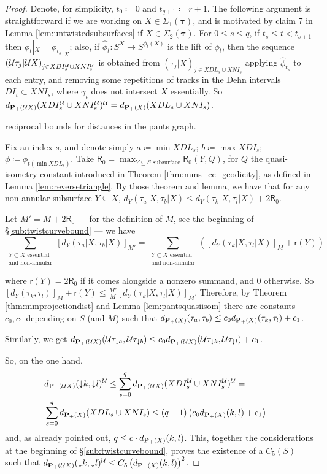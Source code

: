 \begin{proof}
Denote, for simplicity, $t_0\coloneqq 0$ and $t_{q+1}\coloneqq r+1$. The following argument is straightforward if we are working on $X\in \Sigma_1(\bm\tau)$, and is motivated by claim 7 in Lemma \ref{lem:untwistedsubsurfaces} if $X\in \Sigma_2(\bm\tau)$. For $0\leq s \leq q$, if $t_s\leq t < t_{s+1}$ then $\phi_t|_X=\phi_{t_s}|_X$; also, if $\hat \phi_t: S^X\rightarrow S^{\phi_t(X)}$ is the lift of $\phi_t$, then the sequence $\left({\mathcal U}\tau_j|{\mathcal U} X\right)_{j\in XDI_s^{\mathcal U} \cup XNI_s^{\mathcal U}}$ is obtained from $(\tau_j|X)_{j\in XDL_s\cup XNI_s}$ applying $\hat\phi_{t_s}$ to each entry, and removing some repetitions of tracks in the Dehn intervals $DI_t\subset XNI_s$, where $\gamma_t$ does not intersect $X$ essentially. So $d_{{\mathbf{P}_+}({\mathcal U} X)}(XDI_s^{\mathcal U}\cup XNI_s^{\mathcal U})^{\mathcal U}=d_{{\mathbf{P}_+}(X)}(XDL_s\cup XNI_s)$. 

 reciprocal bounds for distances in the pants graph.

Fix an index $s$, and denote simply $a\coloneqq \min XDL_s$; $b\coloneqq \max XDI_s$; $\phi\coloneqq \phi_{t(\min XDL_s)}$. Take $\mathsf{R}_0=\max_{Y\subseteq S \text{ subsurface}} \mathsf{R}_0(Y,Q)$, for $Q$ the quasi-isometry constant introduced in Theorem \ref{thm:mms_cc_geodicity}, as defined in Lemma \ref{lem:reversetriangle}. By those theorem and lemma, we have that for any non-annular subsurface $Y\subseteq X$, $d_Y\left(\tau_a|X,\tau_b|X\right) \leq  d_Y(\tau_k|X,\tau_l|X)+ 2\mathsf{R}_0$.

Let $M'=M+2\mathsf{R}_0$ --- for the definition of $M$, see the beginning of \S \ref{sub:twistcurvebound} --- we have
$$
\sum_{\substack{Y\subset X\text{ essential} \\ \text{and non-annular}}} [d_Y(\tau_a|X,\tau_b|X)]_{M'} =
\sum_{\substack{Y\subset X\text{ essential} \\ \text{and non-annular}}} \left([d_Y(\tau_k|X,\tau_l|X)]_M+ \mathsf{r}(Y)\right)
$$

where $\mathsf{r}(Y)=2\mathsf{R}_0$ if it comes alongside a nonzero summand, and $0$ otherwise. So $[d_Y(\tau_k,\tau_l)]_M+ \mathsf{r}(Y)\leq \frac{M'}{M} [d_Y(\tau_k|X,\tau_l|X)]_M$. Therefore, by Theorem \ref{thm:mmprojectiondist} and Lemma \ref{lem:pantsquasiisom} there are constants $c_0, c_1$ depending on $S$ (and $M$) such that $d_{{\mathbf{P}_+}(X)}(\tau_a,\tau_b)\leq c_0 d_{{\mathbf{P}_+}(X)}(\tau_k,\tau_l) + c_1$.

Similarly, we get $d_{{\mathbf{P}_+}({\mathcal U} X)}({\mathcal U}\tau_{\mathord{\downarrow} a},{\mathcal U}\tau_{\mathord{\downarrow} b})\leq c_0 d_{{\mathbf{P}_+}({\mathcal U} X)}({\mathcal U}\tau_{\mathord{\downarrow} k},{\mathcal U}\tau_{\mathord{\downarrow} l}) + c_1$.

So, on the one hand,
\begin{eqnarray*}
 & d_{{\mathbf{P}_+}({\mathcal U} X)}(\mathord{\downarrow} k,\mathord{\downarrow} l)^{\mathcal U} \leq \sum_{s=0}^q d_{{\mathbf{P}_+}({\mathcal U} X)}(XDI_s^{\mathcal U}\cup XNI_s^{\mathcal U})^{\mathcal U} = & \\
 &  \sum_{s=0}^q d_{{\mathbf{P}_+}(X)}(XDL_s\cup XNI_s) \leq (q+1) \left(c_0 d_{{\mathbf{P}_+}(X)}(k,l)+c_1\right) & 
\end{eqnarray*}
and, as already pointed out, $q\leq c\cdot d_{{\mathbf{P}_+}(X)}(k,l)$. This, together the considerations at the beginning of \S \ref{sub:twistcurvebound}, proves the existence of a $C_5(S)$ such that $d_{{\mathbf{P}_+}({\mathcal U} X)}(\mathord{\downarrow} k,\mathord{\downarrow} l)^{\mathcal U}\leq C_5 \left(d_{{\mathbf{P}_+}(X)}(k,l)\right)^2$.


\end{proof}

